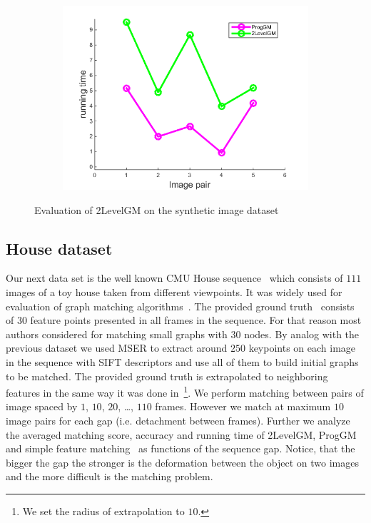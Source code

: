 \begin{figure}[h]
\begin{subfigure}[b]{0.32\textwidth}
			\includegraphics[scale=0.35]{"chapter3/fig/ImageTrafo/anchor_descr/using_cpd_afftrafo/performance/time1"}
		\end{subfigure} 	
	\caption[Evaluation of 2LevelGM on the synthetic image dataset]{Evaluation of 2LevelGM on the synthetic image dataset} \label{fig:ImageTrafo}
\end{figure}

\subsection{House dataset}
Our next data set is the well known CMU House sequence~\cite{CMUHouse} which consists of $111$ images of a toy house taken from different viewpoints. It was widely used for evaluation of graph matching algorithms~\cite{Armiti2014,Hancock_ModalClusters,Cho2010_RRWM,Duchenne2011,FastPFP,Hancock_EM_SVD}. The provided ground truth~\cite{CMUHouse_GT} consists of $30$ feature points presented in all frames in the sequence. For that reason most authors considered for matching small graphs with $30$ nodes. By analog with the previous dataset we used MSER to extract around $250$ keypoints on each image in the sequence with SIFT descriptors and use all of them to build initial graphs to be matched. The provided ground truth is extrapolated to neighboring features in the same way it was done in~\cite{Cho2012_ProgressiveGM}\footnote{We set the radius of extrapolation to $10$.}. We perform matching between pairs of image spaced by $1$, $10$, $20$, \dots, $110$ frames. However we match at maximum $10$ image pairs for each gap (i.e. detachment between frames). Further we  analyze the averaged matching score, accuracy and running time of 2LevelGM, ProgGM and simple feature matching~\cite{Lowe2004} as functions of the sequence gap. Notice, that the bigger the gap the stronger is the deformation between the object on two images and the more difficult is the matching problem. 

